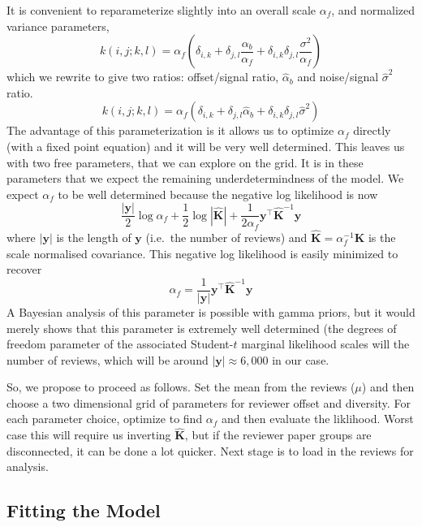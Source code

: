 It is convenient to reparameterize slightly into an overall scale
\(\alpha_f\), and normalized variance parameters, \[
k(i,j; k,l) = \alpha_f(\delta_{i,k}  + \delta_{j,l} \frac{\alpha_b}{\alpha_f} + \delta_{i, k}\delta_{j,l} \frac{\sigma^2}{\alpha_f})
\] which we rewrite to give two ratios: offset/signal ratio,
\(\hat{\alpha}_b\) and noise/signal \(\hat{\sigma}^2\) ratio. \[
k(i,j; k,l) = \alpha_f(\delta_{i,k}  + \delta_{j,l} \hat{\alpha}_b + \delta_{i, k}\delta_{j,l} \hat{\sigma}^2)
\] The advantage of this parameterization is it allows us to optimize
\(\alpha_f\) directly (with a fixed point equation) and it will be very
well determined. This leaves us with two free parameters, that we can
explore on the grid. It is in these parameters that we expect the
remaining underdetermindness of the model. We expect \(\alpha_f\) to be
well determined because the negative log likelihood is now \[
\frac{|\mathbf{y}|}{2}\log\alpha_f + \frac{1}{2}\log  \left|\hat{\mathbf{K}}\right| + \frac{1}{2\alpha_f}\mathbf{y}^\top \hat{\mathbf{K}}^{-1} \mathbf{y}
\] where \(|\mathbf{y}|\) is the length of \(\mathbf{y}\) (i.e.~the
number of reviews) and \(\hat{\mathbf{K}}=\alpha_f^{-1}\mathbf{K}\) is
the scale normalised covariance. This negative log likelihood is easily
minimized to recover \[
\alpha_f = \frac{1}{|\mathbf{y}|} \mathbf{y}^\top \hat{\mathbf{K}}^{-1} \mathbf{y}
\] A Bayesian analysis of this parameter is possible with gamma priors,
but it would merely shows that this parameter is extremely well
determined (the degrees of freedom parameter of the associated
Student-\(t\) marginal likelihood scales will the number of reviews,
which will be around \(|\mathbf{y}| \approx 6,000\) in our case.

So, we propose to proceed as follows. Set the mean from the reviews
(\(\mu\)) and then choose a two dimensional grid of parameters for
reviewer offset and diversity. For each parameter choice, optimize to
find \(\alpha_f\) and then evaluate the liklihood. Worst case this will
require us inverting \(\hat{\mathbf{K}}\), but if the reviewer paper
groups are disconnected, it can be done a lot quicker. Next stage is to
load in the reviews for analysis.

\hypertarget{fitting-the-model}{%
\subsection{Fitting the Model}\label{fitting-the-model}}

\begin{flushright}
\end{flushright}

